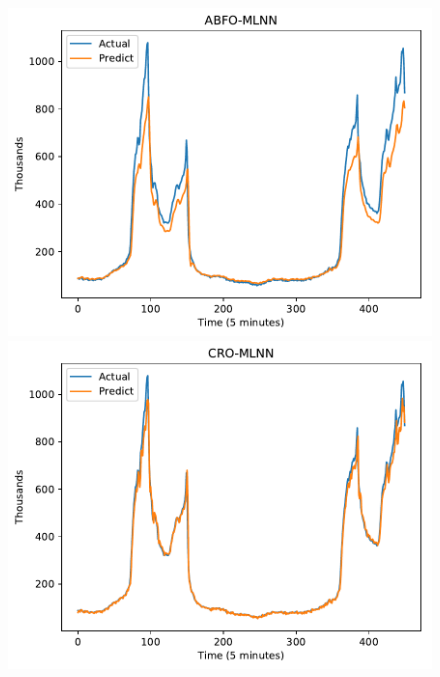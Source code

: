 \documentclass[smallcondensed, natbib]{svjour3}     %
\begin{document}
{\begin{figure}[!ht]
\begin{minipage}[b]{0.33\linewidth}
  \end{minipage} 
  
  \begin{minipage}[b]{0.33\linewidth}
    \centering
    \includegraphics[width=0.9\linewidth]{images/pdf/predict/k5/wc_k5_abfo_mlnn.pdf} 
  \end{minipage}
  \begin{minipage}[b]{0.33\linewidth}
    \centering
    \includegraphics[width=0.9\linewidth]{images/pdf/predict/k5/wc_k5_cro_mlnn.pdf} 
  \end{minipage} 
  \begin{minipage}[b]{0.33\linewidth}
    \centering

\end{minipage}
\end{figure}}
\end{document}

